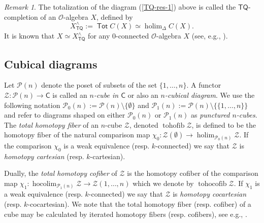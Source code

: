 \documentclass[11pt]{amsart}
\theoremstyle{definition}
\theoremstyle{remark}
\newtheorem{remark}[subsection]{Remark}
\newcommand{\TQ}{\mathsf{TQ}}
\newcommand{\Tot}{\operatorname{\mathsf{Tot}}}
\newcommand{\holim}{\operatorname{holim}}
\newcommand{\tohofib}{\operatorname{tohofib}}
\newcommand{\tohocofib}{\operatorname{tohocofib}}
\newcommand{\Cal}[1]{\mathcal{#1}}
\newcommand{\hocolim}{\operatorname{hocolim}}
\begin{document}
\begin{remark} \label{TQ-completion} The totalization of the diagram (\ref{TQ-res-1}) above is called the $\TQ$-completion of an $\Cal{O}$-algebra $X$, defined by \[X_{\TQ}^{\wedge}:=\Tot C(X) \simeq \holim_{\Delta} C(X).\]
It is known that $X\simeq X_{\TQ}^{\wedge}$ for any $0$-connected $\Cal{O}$-algebra $X$ (see, e.g., \cite{Ching-Harper-BM}).
\end{remark}  


\subsection{Cubical diagrams} \label{sec:cubical-diags}
Let $\Cal{P}(n)$ denote the poset of subsets of the set $\{1,\dots,n\}$. A functor $\Cal{Z}\colon \Cal{P}(n)\to \mathsf{C}$ is called an \textit{$n$-cube in $\mathsf{C}$} or also an \textit{$n$-cubical diagram}. We use the following notation $\Cal{P}_0(n):=\Cal{P}(n)\setminus \{\emptyset\}$ and $ \Cal{P}_1(n):=\Cal{P}(n)\setminus \{\{1,\dots,n\}\}$ and refer to diagrams shaped on either $\Cal{P}_0(n)$ or $\Cal{P}_1(n)$ as \textit{punctured $n$-cubes}. The \textit{total homotopy fiber} of an $n$-cube $\Cal{Z}$, denoted $\tohofib \Cal{Z}$, is defined to be the homotopy fiber of the natural comparison map $\chi_0\colon \Cal{Z}(\emptyset)\to \holim_{\Cal{P}_0(n)} \Cal{Z}$. If the comparison $\chi_0$ is a weak equivalence (resp. $k$-connected) we say that $\Cal{Z}$ is \textit{homotopy cartesian} (resp. $k$-cartesian). 

Dually, the \textit{total homotopy cofiber} of $\Cal{Z}$ is the homotopy cofiber of the comparison map $\chi_1\colon\hocolim_{\Cal{P}_1(n)} \Cal{Z} \to \Cal{Z}(1,\dots,n)$ which we denote by $\tohocofib \Cal{Z}$. If $\chi_1$ is a weak equivalence (resp. $k$-connected) we say that $\Cal{Z}$ is \textit{homotopy cocartesian} (resp. $k$-cocartesian). We note that the total homotopy fiber (resp. cofiber) of a cube may be calculated by iterated homotopy fibers (resp. cofibers), see e.g.,  \cite[3.2]{BJM-cross}.
\end{document}
